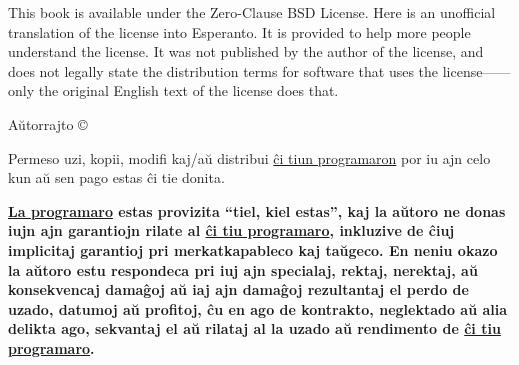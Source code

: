 \begingroup
\renewcommand{\thepage}{a}
\maketitle
\endgroup
\clearpage

\setcounter{page}{2}%
\thispagestyle{empty}%

\begingroup
\setlength{\parindent}{1.5em}%

\noindent%
%
{This book is available under the Zero-Clause BSD License.}
%
{Here is an unofficial translation of the license into Esperanto.}
%
{It is provided to help more people understand the license.}
%
{It was not published by the author of the license,}
%
{and does not legally state the distribution terms for software}
%
{that uses the license—}—%
%
{only the original English text of the license does that.}

\vspace{1.5ex}

Aŭtorrajto © \thedate{} \theauthor{}

Permeso uzi, kopii, modifi kaj/aŭ distribui
\href{https://gitee.com/septsea/det}{ĉi tiun programaron}
por iu ajn celo kun aŭ sen pago estas ĉi tie donita.

\textbf{%
    \href{https://gitee.com/septsea/det}{La programaro}
    estas provizita ``tiel, kiel estas'', kaj la aŭtoro ne donas iujn ajn garantiojn rilate al
    \href{https://gitee.com/septsea/det}{ĉi tiu programaro},
    inkluzive de ĉiuj implicitaj garantioj pri merkatkapableco kaj taŭgeco. En neniu okazo la aŭtoro estu respondeca pri iuj ajn specialaj, rektaj, nerektaj, aŭ konsekvencaj damaĝoj aŭ iaj ajn damaĝoj rezultantaj el perdo de uzado, datumoj aŭ profitoj, ĉu en ago de kontrakto, neglektado aŭ alia delikta ago, sekvantaj el aŭ rilataj al la uzado aŭ rendimento de
    \href{https://gitee.com/septsea/det}{ĉi tiu programaro}.%
}

